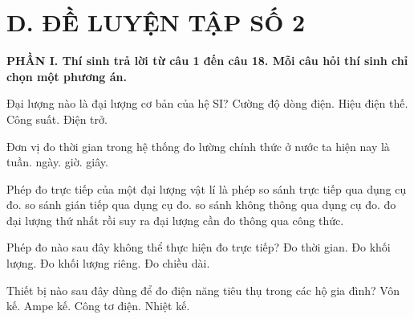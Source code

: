 \section*{D. ĐỀ LUYỆN TẬP SỐ 2}

\noindent\textbf{\large PHẦN I. Thí sinh trả lời từ câu 1 đến câu 18. Mỗi câu hỏi thí sinh chỉ chọn một phương án.}\par\vspace{0.2cm}
\begin{ex}
Đại lượng nào là đại lượng cơ bản của hệ SI?
\choice
{\True Cường độ dòng điện.}
{Hiệu điện thế.}
{Công suất.}
{Điện trở.}
\end{ex}

\begin{ex}
Đơn vị đo thời gian trong hệ thống đo lường chính thức ở nước ta hiện nay là
\choice
{tuần.}
{ngày.}
{giờ.}
{\True giây.}
\end{ex}

\begin{ex}
Phép đo trực tiếp của một đại lượng vật lí là phép
\choice
{\True so sánh trực tiếp qua dụng cụ đo.}
{so sánh gián tiếp qua dụng cụ đo.}
{so sánh không thông qua dụng cụ đo.}
{đo đại lượng thứ nhất rồi suy ra đại lượng cần đo thông qua công thức.}
\end{ex}

\begin{ex}
Phép đo nào sau đây không thể thực hiện đo trực tiếp?
\choice
{Đo thời gian.}
{Đo khối lượng.}
{\True Đo khối lượng riêng.}
{Đo chiều dài.}
\end{ex}

\begin{ex}
Thiết bị nào sau đây dùng để đo điện năng tiêu thụ trong các hộ gia đình?
\choice
{Vôn kế.}
{Ampe kế.}
{\True Công tơ điện.}
{Nhiệt kế.}
\end{ex}

